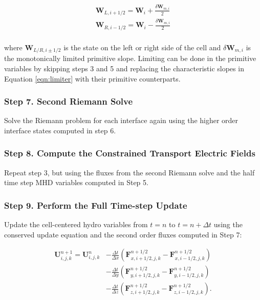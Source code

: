     \begin{equation}
        \begin{aligned}
            \boldsymbol{W}_{L, i+1/2} = \boldsymbol{W}_{i} + \frac{\delta \boldsymbol{W}_{m, i}}{2} \\
            \boldsymbol{W}_{R, i-1/2} = \boldsymbol{W}_{i} - \frac{\delta \boldsymbol{W}_{m, i}}{2} \\
        \end{aligned}
    \end{equation}

    \noindent where $ \boldsymbol{W}_{L/R, i\pm1/2} $ is the state on the left or right side
    of the cell and $ \delta \boldsymbol{W}_{m, i} $ is the monotonically limited
    primitive slope. Limiting can be done in the primitive variables by skipping steps 3 and 5 and replacing the characteristic slopes in Equation \ref{eqn:limiter} with their primitive counterparts.

\subsubsection{Step 7. Second Riemann Solve}
\label{vlct:2nd-riemann-solve}

Solve the Riemann problem for each interface again using the higher order interface states computed in step 6.

\subsubsection{Step 8. Compute the Constrained Transport Electric Fields}
\label{vlct:2nd-emf}

Repeat step 3, but using the fluxes from the second Riemann solve and the half time step MHD variables computed in Step 5.

\subsubsection{Step 9. Perform the Full Time-step Update}
\label{vlct:full-dt-update}

Update the cell-centered hydro variables from $t = n$ to $t = n + \Delta t$ using the conserved update equation and the second order fluxes computed in Step 7:

\begin{equation}
    \begin{aligned}
        \boldsymbol{U}^{n+1}_{i,j,k} = \boldsymbol{U}^{n}_{i,j,k}
        &- \frac{\Delta t}{\Delta x} \left( \boldsymbol{F}^{n+1/2}_{x,i+1/2,j,k} - \boldsymbol{F}^{n+1/2}_{x,i-1/2,j,k} \right) \\
        &- \frac{\Delta t}{\Delta y} \left( \boldsymbol{F}^{n+1/2}_{y,i+1/2,j,k} - \boldsymbol{F}^{n+1/2}_{y,i-1/2,j,k} \right) \\
        &- \frac{\Delta t}{\Delta z} \left( \boldsymbol{F}^{n+1/2}_{z,i+1/2,j,k} - \boldsymbol{F}^{n+1/2}_{z,i-1/2,j,k} \right).
    \end{aligned}
\end{equation}

